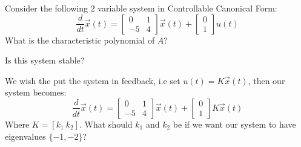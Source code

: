 
\begin{enumerate}

\qitem Consider the following 2 variable system in Controllable Canonical Form:
$$
\frac{d}{dt}\vec{x}(t) = 
\begin{bmatrix}
0 & 1 \\
-5 & 4
\end{bmatrix}
\vec{x}(t) +
\begin{bmatrix}
0 \\
1
\end{bmatrix}
u(t)
$$
What is the characteristic polynomial of $A$?





\qitem Is this system stable?



\qitem We wish the put the system in feedback, i.e set $u(t) = K\vec{x}(t)$, then our system becomes:
$$
\frac{d}{dt}\vec{x}(t) = 
\begin{bmatrix}
0 & 1 \\
-5 & 4
\end{bmatrix}
\vec{x}(t) +
\begin{bmatrix}
0 \\
1
\end{bmatrix}
K
\vec{x}(t)
$$
Where $K = [k_1~k_2]$. What should $k_1$ and $k_2$ be if we want our system to have eigenvalues $\{-1, -2\}$?


\end{enumerate}
